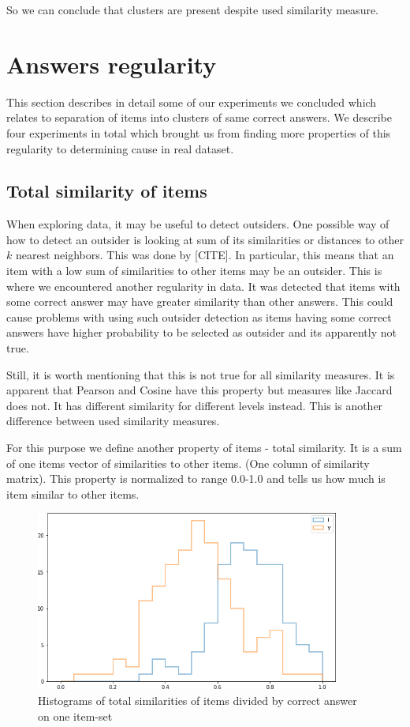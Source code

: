 \documentclass[
  digital, %
  table,   %
  nolof,     %
  nolot,     %
  nocover,
  color
]{fithesis3}
\begin{document}
So we can conclude that clusters are present despite used similarity measure.


\section{Answers regularity}\label{evaulation-answers-regularity}

This section describes in detail some of our experiments we concluded which relates to separation of items into clusters of same correct answers. We describe four experiments in total which brought us from finding more properties of this regularity to determining cause in real dataset.


\subsection{Total similarity of items}\label{total-similarity-of-items}

When exploring data, it may be useful to detect outsiders. One possible way of how to detect an outsider is looking at sum of its similarities or distances to other $k$ nearest neighbors. This was done by [CITE]. In particular, this means that an item with a low sum of similarities to other items may be an outsider. This is where we encountered another regularity in data. It was detected that items with some correct answer may have greater similarity than other answers. This could cause problems with using such outsider detection as items having some correct answers have higher probability to be selected as outsider and its apparently not true.

Still, it is worth mentioning that this is not true for all similarity measures. It is apparent that Pearson and Cosine have this property but measures like Jaccard does not. It has different similarity for different levels instead. This is another difference between used similarity measures.

For this purpose we define another property of items - total similarity. It is a sum of one items vector of similarities to other items. (One column of similarity matrix). This property is normalized to range 0.0-1.0 and tells us how much is item similar to other items.

\begin{figure}
  \includegraphics[width=10cm]{img/histogram_i_y}
  \caption{Histograms of total similarities of items divided by correct answer on one item-set}
  \label{fig:histogram_i_y}
\end{figure}
\end{document}
